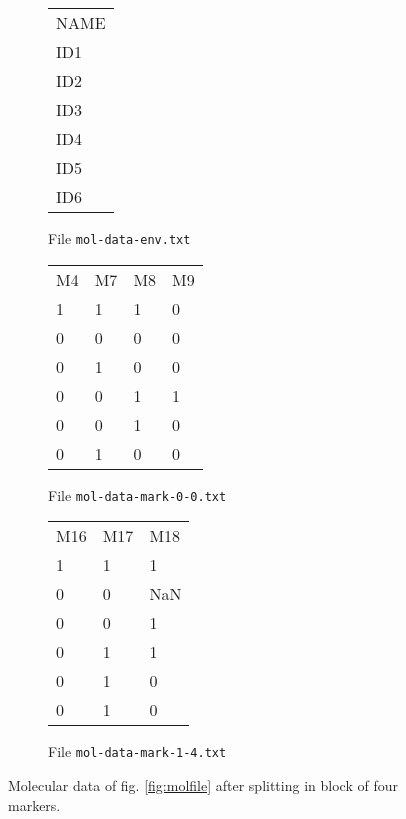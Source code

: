 \documentclass[a4paper,11pt]{article}
\begin{document}
\begin{figure}[htbp]
\begin{center}
\begin{subfigure}{0.27\textwidth}
		\begin{mdframed}[backgroundcolor=white,userdefinedwidth=2cm,align=center]
		\begin{tabular}{l}
NAME\\
ID1\\
ID2\\
ID3\\
ID4\\
ID5\\
ID6\\
		\end{tabular}
	\end{mdframed}
	\parbox[l]{\textwidth}{\caption{File \newline \texttt{mol-data-env.txt}\label{fig:molfile-split-env}}}
	\end{subfigure}%
	\hfill
	\begin{subfigure}[c]{0.35\textwidth}
		\begin{mdframed}[backgroundcolor=white,userdefinedwidth=4.2cm,align=center]
		\begin{tabular}{llll}
	M4	&M7	&M8	&M9\\
	 1	&1	&1	&0	\\
 0	&0	&0	&0		\\
 0	&1	&0	&0	\\
 0	&0	&1	&1	\\
 0	&0	&1	&0	\\
 0	&1	&0	&0	\\
		\end{tabular}
	\end{mdframed}
	\parbox[l]{\textwidth}{\caption{File \newline \texttt{mol-data-mark-0-0.txt}\label{fig:molfile-split-mol-0}}}
	\end{subfigure}%
	\hfill
\begin{subfigure}{0.35\textwidth}
		\begin{mdframed}[backgroundcolor=white,userdefinedwidth=4.2cm,align=center]
		\begin{tabular}{lll}
M16	&M17	&M18\\
1	&1	&1\\
0	&0	&NaN\\
0	&0	&1\\
0	&1	&1\\
0	&1	&0\\
0	&1	&0\\
		\end{tabular}
	\end{mdframed}
	\parbox[l]{\textwidth}{\caption{File \newline \texttt{mol-data-mark-1-4.txt}\label{fig:molfile-split-mol-1}}}
	\end{subfigure}	
	
	\caption{Molecular data of fig. \ref{fig:molfile} after splitting in block of four markers.}
	\label{fig:molfile-split}
	\end{center}
\end{figure}
\end{document}

